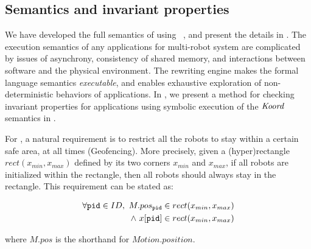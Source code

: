 

\subsection{Semantics and invariant properties}

We have developed the full semantics of \lgname using \K~\cite{rosu-serbanuta-2013-k}, and present the details in .
The execution semantics of any applications for multi-robot system are complicated by issues of asynchrony,
consistency of shared memory, and interactions between software and the physical environment.
The \K rewriting engine makes the formal language semantics \emph{executable},
and enables exhaustive exploration of non-deterministic behaviors of \lgname applications.
In , we present a method for checking invariant properties for \lgname applications using symbolic execution of the $\emph{Koord}$ semantics in \K.

For \LineForm, a natural requirement is to restrict all the robots to stay within a certain safe area, at all times (Geofencing).
More precisely, given a (hyper)rectangle $\mathit{rect}(x_{min}, x_{max})$ defined by its two corners $x_{min}$ and $x_{max}$,
if all robots are initialized within the rectangle, then all robots should always stay in the rectangle.
This requirement can be stated as:
\begin{invariant}
\label{inv:lineform}
\[
\begin{split}
    \forall \texttt{pid} \in ID,\ M.pos_{\texttt{pid}} \in rect(x_{min}, x_{max}) \\
    \land\ x[\texttt{pid}] \in rect(x_{min}, x_{max})
\end{split}
\]
\end{invariant}
\noindent
where $M.pos$ is the shorthand for $Motion.position$.


